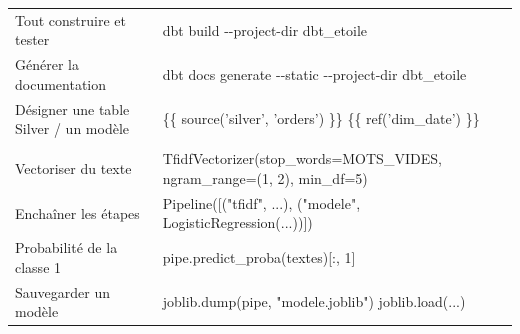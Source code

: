 \documentclass[11pt,a4paper]{article}
\begin{document}
\begin{center}
\begin{tabularx}{\textwidth}{@{}>{\raggedright\arraybackslash}p{4.1cm} >{\raggedright\arraybackslash\ttfamily\footnotesize}X@{}}
Tout construire et tester & dbt build -{}-project-dir dbt\_etoile \\
Générer la documentation & dbt docs generate -{}-static -{}-project-dir dbt\_etoile \\
Désigner une table Silver / un modèle & \{\{ source('silver', 'orders') \}\} \quad \{\{ ref('dim\_date') \}\} \\
\midrule
\multicolumn{2}{@{}l}{\textbf{\textcolor{lhblue}{scikit-learn}}} \\
Vectoriser du texte & TfidfVectorizer(stop\_words=MOTS\_VIDES, ngram\_range=(1, 2), min\_df=5) \\
Enchaîner les étapes & Pipeline([("tfidf", ...), ("modele", LogisticRegression(...))]) \\
Probabilité de la classe 1 & pipe.predict\_proba(textes)[:, 1] \\
Sauvegarder un modèle & joblib.dump(pipe, "modele.joblib") \quad joblib.load(...) \\
\bottomrule
\end{tabularx}
\end{center}
\end{document}

